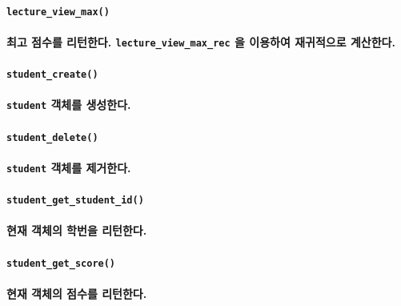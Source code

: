 \documentclass[UTF8]{report}
\begin{document}
            \paragraph{\texttt{lecture\_view\_max()}}
            \paragraph{%
                \normalfont 최고 점수를 리턴한다. \texttt{lecture\_view\_max\_rec} 을 이용하여 재귀적으로 계산한다.
            }

            \paragraph{\texttt{student\_create()}}
            \paragraph{%
                \normalfont \texttt{student} 객체를 생성한다.
            }

            \paragraph{\texttt{student\_delete()}}
            \paragraph{%
                \normalfont \texttt{student} 객체를 제거한다.
            }

            \paragraph{\texttt{student\_get\_student\_id()}}
            \paragraph{%
                \normalfont 현재 객체의 학번을 리턴한다.
            }

            \paragraph{\texttt{student\_get\_score()}}
            \paragraph{%
                \normalfont 현재 객체의 점수를 리턴한다.
            }
\end{document}
